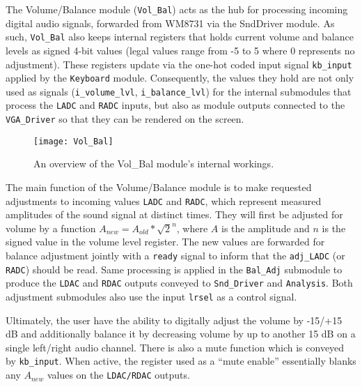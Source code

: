 The Volume/Balance module (\verb=Vol_Bal=) acts as the hub for processing incoming digital audio signals, forwarded from WM8731 via the SndDriver module. As such, \verb=Vol_Bal= also keeps internal registers that holds current volume and balance levels as signed 4-bit values (legal values range from -5 to 5 where 0 represents no adjustment). These registers update via the one-hot coded input signal \verb=kb_input= applied by the \verb=Keyboard= module. Consequently, the values they hold are not only used as signals (\verb=i_volume_lvl=, \verb=i_balance_lvl=) for the internal submodules that process the \verb=LADC= and \verb=RADC= inputs, but also as module outputs connected to the \verb=VGA_Driver= so that they can be rendered on the screen.

\begin{figure}[h]
  \centering
  \texttt{[image: Vol\_Bal]}
  \caption{An overview of the Vol\_Bal module's internal workings.}
  \label{fig:vol_bal}
\end{figure}

The main function of the Volume/Balance module is to make requested adjustments to incoming values \verb=LADC= and \verb=RADC=, which represent measured amplitudes of the sound signal at distinct times. They will first be adjusted for volume by a function $A_{new} = A_{old} * \sqrt{2}^n$, where $A$ is the amplitude and $n$ is the signed value in the volume level register. The new values are forwarded for balance adjustment jointly with a \verb=ready= signal to inform that the \verb=adj_LADC= (or \verb=RADC=) should be read. Same processing is applied in the \verb=Bal_Adj= submodule to produce the \verb=LDAC= and \verb=RDAC= outputs conveyed to \verb=Snd_Driver= and \verb=Analysis=. Both adjustment submodules also use the input \verb=lrsel= as a control signal.

Ultimately, the user have the ability to digitally adjust the volume by -15/+15 dB and additionally balance it by decreasing volume by up to another 15 dB on a single left/right audio channel. There is also a mute function which is conveyed by \verb=kb_input=. When active, the register used as a ``mute enable'' essentially blanks any $A_{new}$ values on the \verb=LDAC/RDAC= outputs.


